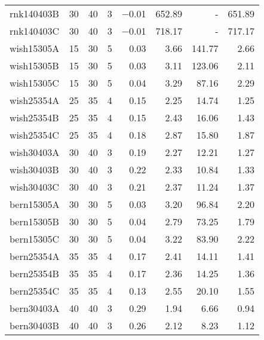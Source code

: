 \begin{scriptsize}
\begin{xtabular*}{\linewidth}{@{\extracolsep{\fill}}lrrrrrrr@{}}
rnk140403B & \num{30} & \num{40} & \num{3} & \num{-0.01} & \num{652.89} & - & \num{651.89} \\ 
rnk140403C & \num{30} & \num{40} & \num{3} & \num{-0.01} & \num{718.17} & - & \num{717.17} \\ 
wish15305A & \num{15} & \num{30} & \num{5} & \num{0.03} & \num{3.66} & \num{141.77} & \num{2.66} \\ 
wish15305B & \num{15} & \num{30} & \num{5} & \num{0.03} & \num{3.11} & \num{123.06} & \num{2.11} \\ 
wish15305C & \num{15} & \num{30} & \num{5} & \num{0.04} & \num{3.29} & \num{87.16} & \num{2.29} \\ 
wish25354A & \num{25} & \num{35} & \num{4} & \num{0.15} & \num{2.25} & \num{14.74} & \num{1.25} \\ 
wish25354B & \num{25} & \num{35} & \num{4} & \num{0.15} & \num{2.43} & \num{16.06} & \num{1.43} \\ 
wish25354C & \num{25} & \num{35} & \num{4} & \num{0.18} & \num{2.87} & \num{15.80} & \num{1.87} \\ 
wish30403A & \num{30} & \num{40} & \num{3} & \num{0.19} & \num{2.27} & \num{12.21} & \num{1.27} \\ 
wish30403B & \num{30} & \num{40} & \num{3} & \num{0.22} & \num{2.33} & \num{10.84} & \num{1.33} \\ 
wish30403C & \num{30} & \num{40} & \num{3} & \num{0.21} & \num{2.37} & \num{11.24} & \num{1.37} \\ 
bern15305A & \num{30} & \num{30} & \num{5} & \num{0.03} & \num{3.20} & \num{96.84} & \num{2.20} \\ 
bern15305B & \num{30} & \num{30} & \num{5} & \num{0.04} & \num{2.79} & \num{73.25} & \num{1.79} \\ 
bern15305C & \num{30} & \num{30} & \num{5} & \num{0.04} & \num{3.22} & \num{83.90} & \num{2.22} \\ 
bern25354A & \num{35} & \num{35} & \num{4} & \num{0.17} & \num{2.41} & \num{14.11} & \num{1.41} \\ 
bern25354B & \num{35} & \num{35} & \num{4} & \num{0.17} & \num{2.36} & \num{14.25} & \num{1.36} \\ 
bern25354C & \num{35} & \num{35} & \num{4} & \num{0.13} & \num{2.55} & \num{20.10} & \num{1.55} \\ 
bern30403A & \num{40} & \num{40} & \num{3} & \num{0.29} & \num{1.94} & \num{6.66} & \num{0.94} \\ 
bern30403B & \num{40} & \num{40} & \num{3} & \num{0.26} & \num{2.12} & \num{8.23} & \num{1.12} \\ 

\end{xtabular*}
\end{scriptsize}
